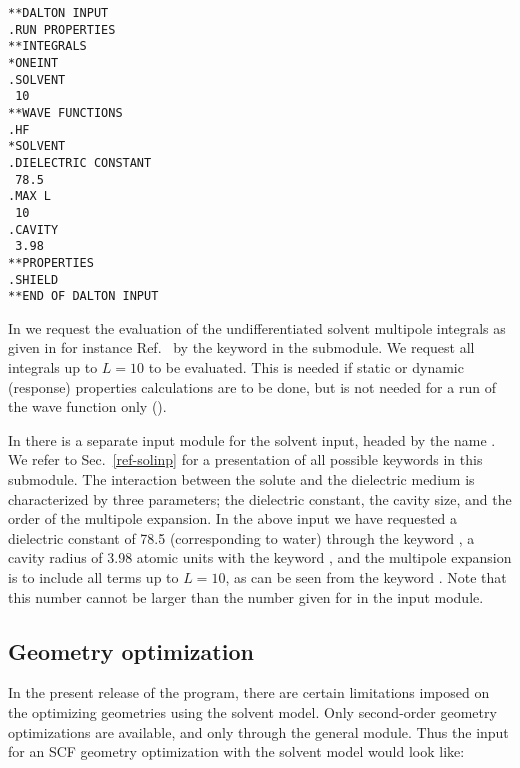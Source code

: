 \begin{verbatim}
**DALTON INPUT
.RUN PROPERTIES
**INTEGRALS
*ONEINT
.SOLVENT
 10
**WAVE FUNCTIONS
.HF
*SOLVENT
.DIELECTRIC CONSTANT
 78.5
.MAX L
 10
.CAVITY
 3.98
**PROPERTIES
.SHIELD
**END OF DALTON INPUT
\end{verbatim}

In  we request the evaluation of the undifferentiated solvent
multipole integrals as given in for instance
Ref.~\cite{kvmhahjajthjcp89} by the keyword  in the
 submodule. We request all
integrals up to $L=10$ to be evaluated. This is needed if static or
dynamic (response) properties
calculations are to be done, but is not needed for a run of the
wave function only ().

In  there is a separate input module for the
solvent input,
headed by the name . We refer to Sec.~\ref{ref-solinp}
for a presentation of all possible keywords in this submodule. The
interaction between the solute and the dielectric
medium is
characterized by three parameters; the dielectric
constant, the cavity
size, and the order of the multipole
expansion. In the above input we have
requested a dielectric constant of 78.5 (corresponding to water)
through the keyword , a cavity radius of 3.98 atomic
units with the keyword , and the multipole expansion is to
include all terms up to $L=10$, as can be seen from the keyword
. Note that this number cannot be larger than the number given for
 in the  input module.

\subsection{Geometry optimization}\label{sec:solventgeoopt}

In the present release of the {\dalton} program, there are certain
limitations imposed on the optimizing geometries using the solvent
model. Only second-order geometry optimizations
are available, and only through the general  module. 
Thus the input for an SCF geometry optimization with the solvent model
would look like:

